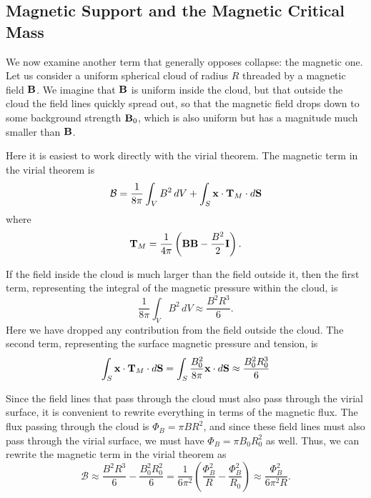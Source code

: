 \subsection{Magnetic Support and the Magnetic Critical Mass}

We now examine another term that generally opposes collapse: the magnetic one. Let us consider a uniform spherical cloud of radius $R$ threaded by a magnetic field $\mathbf{B}$. We imagine that $\mathbf{B}$ is uniform inside the cloud, but that outside the cloud the field lines quickly spread out, so that the magnetic field drops down to some background strength $\mathbf{B}_0$, which is also uniform but has a magnitude much smaller than $\mathbf{B}$.

Here it is easiest to work directly with the virial theorem. The magnetic term in the virial theorem is
\begin{equation}
\mathcal{B} = \frac{1}{8\pi} \int_V B^2 \,dV + \int_S \mathbf{x} \cdot \mathbf{T}_M \cdot d\mathbf{S}
\end{equation}
where
\begin{equation}
\mathbf{T}_M = \frac{1}{4\pi} \left(\mathbf{B}\mathbf{B} - \frac{B^2}{2}\mathbf{I}\right).
\end{equation}

If the field inside the cloud is much larger than the field outside it, then the first term, representing the integral of the magnetic pressure within the cloud, is
\begin{equation}
\frac{1}{8\pi} \int_V B^2\, dV \approx \frac{B^2 R^3}{6}.
\end{equation}
Here we have dropped any contribution from the field outside the cloud. The second term, representing the surface magnetic pressure and tension, is
\begin{equation}
\int_S \mathbf{x} \cdot \mathbf{T}_M \cdot d\mathbf{S} = \int_S \frac{B_0^2}{8\pi} \mathbf{x} \cdot d\mathbf{S}
\approx \frac{B_0^2 R_0^3}{6}
\end{equation}

Since the field lines that pass through the cloud must also pass through the virial surface, it is convenient to rewrite everything in terms of the magnetic flux. The flux passing through the cloud is $\Phi_B = \pi B R^2$, and since these field lines must also pass through the virial surface, we must have $\Phi_B = \pi B_0 R_0^2$ as well. Thus, we can rewrite the magnetic term in the virial theorem as
\begin{equation}
\mathcal{B} \approx \frac{B^2 R^3}{6} - \frac{B_0^2 R_0^2}{6} = \frac{1}{6\pi^2} \left(\frac{\Phi_B^2}{R} - \frac{\Phi_B^2}{R_0}\right) \approx \frac{\Phi_B^2}{6\pi^2 R}.
\end{equation}

